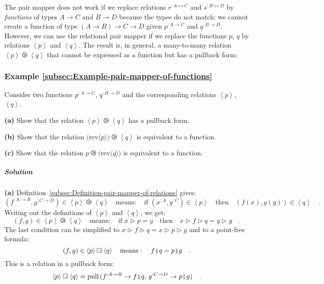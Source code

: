 The pair mapper does not work if we replace relations $r^{:A\leftrightarrow C}$
and $s^{:B\leftrightarrow D}$ by \emph{functions} of types $A\rightarrow C$
and $B\rightarrow D$ because the types do not match: we cannot create
a function of type $\left(A\rightarrow B\right)\rightarrow C\rightarrow D$
given $p^{:A\rightarrow C}$ and $q^{:B\rightarrow D}$. However,
we can use the relational pair mapper if we replace the functions
$p$, $q$ by relations $\left<p\right>$ and $\left<q\right>$. The
result is, in general, a many-to-many relation $\left<p\right>\ogreaterthan\left<q\right>$
that cannot be expressed as a function but has a pullback form:

\subsubsection{Example \label{subsec:Example-pair-mapper-of-functions}\ref{subsec:Example-pair-mapper-of-functions}}

Consider two functions $p^{:A\rightarrow C}$, $q^{:B\rightarrow D}$
and the corresponding relations $\left<p\right>$, $\left<q\right>$.

\textbf{(a)} Show that the relation $\left<p\right>\ogreaterthan\left<q\right>$
has a pullback form.

\textbf{(b)} Show that the relation $\big(\text{rev}\langle p\rangle\big)\ogreaterthan\left<q\right>$
is equivalent to a function.

\textbf{(c)} Show that the relation $p\ogreaterthan\big(\text{rev}\langle q\rangle\big)$
is equivalent to a function.

\subparagraph{Solution}

\textbf{(a)} Definition~\ref{subsec:Definition-pair-mapper-of-relations}
gives:
\[
(f^{:A\rightarrow B},g^{:C\rightarrow D})\in\left<p\right>\ogreaterthan\left<q\right>\quad\text{means}:\quad\text{if }(x^{:A},y^{:C})\in\left<p\right>\quad\text{then}\quad(f(x),g(y))\in\left<q\right>\quad.
\]
Writing out the definitions of $\left<p\right>$ and $\left<q\right>$,
we get:
\[
(f,g)\in\left<p\right>\ogreaterthan\left<q\right>\quad\text{means}:\quad\text{if }x\triangleright p=y\quad\text{then}\quad x\triangleright f\triangleright q=y\triangleright g\quad.
\]
The last condition can be simplified to $x\triangleright f\triangleright q=x\triangleright p\triangleright g$
and to a point-free formula:
\[
(f,g)\in\left<p\right>\ogreaterthan\left<q\right>\quad\text{means}:\quad f\bef q=p\bef g\quad.
\]
This is a relation in a pullback form:
\[
\left<p\right>\ogreaterthan\left<q\right>=\text{pull}\,(f^{:A\rightarrow B}\rightarrow f\bef q,\,g^{:C\rightarrow D}\rightarrow p\bef g)\quad.
\]

